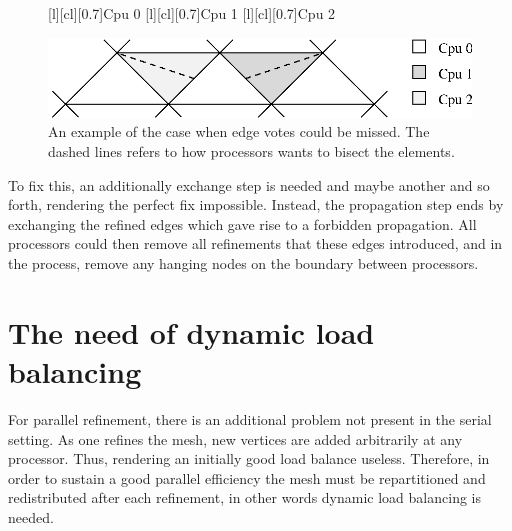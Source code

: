 \begin{figure}[htb]
 [l][cl][0.7]{Cpu 0}
 [l][cl][0.7]{Cpu 1}
 [l][cl][0.7]{Cpu 2}
  \begin{center}
   \includegraphics[width=0.65\columnwidth]{chapters/hoffman-4/eps/probmissing.eps}
  \end{center}
   \caption{An example of the case when edge votes could be missed. The dashed lines refers to how processors wants to bisect the elements.}
   \label{hoffman-4:fig:probmissing}

\end{figure}

To fix this, an additionally exchange step is needed and maybe another
and so forth, rendering the perfect fix impossible. Instead, the
propagation step ends by exchanging the refined edges which gave rise
to a forbidden propagation. All processors could then remove all
refinements that these edges introduced, and in the process, remove
any hanging nodes on the boundary between processors.

\section{The need of dynamic load balancing}

For parallel refinement, there is an additional problem not present in
the serial setting. As one refines the mesh, new vertices are added
arbitrarily at any processor. Thus, rendering an initially good load
balance useless. Therefore, in order to sustain a good parallel
efficiency the mesh must be repartitioned and redistributed after each
refinement, in other words dynamic load balancing is needed.

